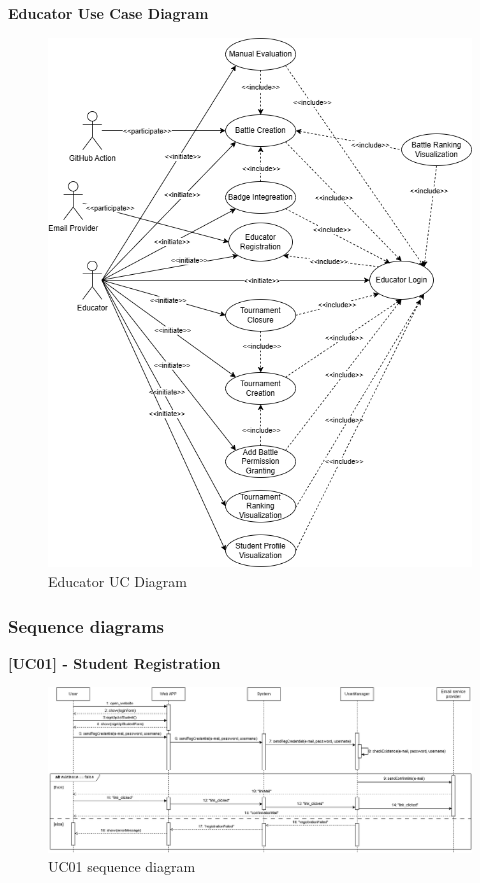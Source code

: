 \textbf{Educator Use Case Diagram}
\begin{figure}[H]
    \centering
    \includegraphics[width=1\linewidth]{Images/UC_Educator.png}
    \caption{Educator UC Diagram}
    \label{fig:uc_educator}
\end{figure}

\newpage

\subsubsection{Sequence diagrams}

\textbf{[UC01] - Student Registration}
\begin{figure}[H]
    \centering
    \includegraphics[width=1\linewidth]{Images/SD_StudentRegistration.png}
    \caption{UC01 sequence diagram}
    \label{fig:uc01}
\end{figure}

